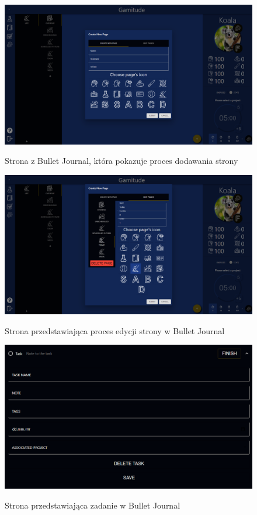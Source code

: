 \documentclass[a4paper,11pt]{report}
\begin{document}
\begin{figure}[H]
	\centering
	\includegraphics[scale=0.3]{prezentacja/Page_add}\\
	\caption{Strona z Bullet Journal, która pokazuje proces dodawania strony}
	\label{fig:Page_add}
\end{figure}
\begin{figure}[H]
	\centering
	\includegraphics[scale=0.3]{prezentacja/Page_edit}\\
	\caption{Strona przedstawiająca proces edycji strony w Bullet Journal}
	\label{fig:Page_edit}
\end{figure}
\begin{figure}[H]
	\centering
	\includegraphics[scale=0.3]{prezentacja/ProjectTask}\\
	\caption{Strona przedstawiająca zadanie w Bullet Journal}
	\label{fig:ProjectTask}
\end{figure}
\end{document}
